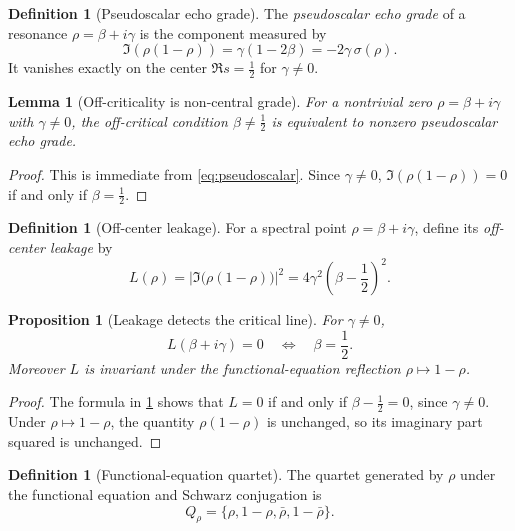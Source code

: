 \documentclass[11pt,a4paper]{article}
\theoremstyle{plain}
\newtheorem{proposition}[theorem]{Proposition}
\newtheorem{lemma}[theorem]{Lemma}
\theoremstyle{definition}
\newtheorem{definition}[theorem]{Definition}
\theoremstyle{remark}
\numberwithin{equation}{section}
\begin{document}
\begin{definition}[Pseudoscalar echo grade]
The \emph{pseudoscalar echo grade} of a resonance
\(\rho=\beta+i\gamma\) is the component measured by
\[
  \Im(\rho(1-\rho))
  =
  \gamma(1-2\beta)
  =
  -2\gamma\,\sigma(\rho).
  \label{eq:pseudoscalar}
\]
It vanishes exactly on the center \(\Re s=\tfrac12\) for
\(\gamma\ne0\).
\end{definition}

\begin{lemma}[Off-criticality is non-central grade]
\label{lem:offcritical-grade}
For a nontrivial zero \(\rho=\beta+i\gamma\) with \(\gamma\ne0\), the
off-critical condition \(\beta\ne\tfrac12\) is equivalent to nonzero
pseudoscalar echo grade.
\end{lemma}

\begin{proof}
This is immediate from \eqref{eq:pseudoscalar}.  Since
\(\gamma\ne0\), \(\Im(\rho(1-\rho))=0\) if and only if
\(\beta=\tfrac12\).
\end{proof}

\begin{definition}[Off-center leakage]
\label{def:offcenter-leakage}
For a spectral point \(\rho=\beta+i\gamma\), define its
\emph{off-center leakage} by
\[
  L(\rho)
  =
  \left|\Im\bigl(\rho(1-\rho)\bigr)\right|^2
  =
  4\gamma^2\left(\beta-\frac12\right)^2.
\]
\end{definition}

\begin{proposition}[Leakage detects the critical line]
\label{prop:leakage-detects-line}
For \(\gamma\ne0\),
\[
  L(\beta+i\gamma)=0
  \quad\Longleftrightarrow\quad
  \beta=\frac12.
\]
Moreover \(L\) is invariant under the functional-equation reflection
\(\rho\mapsto1-\rho\).
\end{proposition}

\begin{proof}
The formula in \cref{def:offcenter-leakage} shows that \(L=0\) if and
only if \(\beta-\tfrac12=0\), since \(\gamma\ne0\).  Under
\(\rho\mapsto1-\rho\), the quantity \(\rho(1-\rho)\) is unchanged, so
its imaginary part squared is unchanged.
\end{proof}

\begin{definition}[Functional-equation quartet]
\label{def:fe-quartet}
The quartet generated by \(\rho\) under the functional equation and
Schwarz conjugation is
\[
  Q_\rho=\{\rho,1-\rho,\bar\rho,1-\bar\rho\}.
\]
\end{definition}
\end{document}
